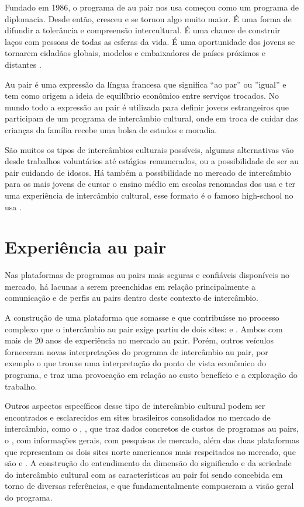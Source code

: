 
    Fundado em 1986, o programa de au pair nos \ac{usa} começou como um programa de diplomacia. Desde então, cresceu e se tornou algo muito maior. É uma forma de difundir a tolerância e compreensão intercultural. É uma chance de construir laços com pessoas de todas as esferas da vida. É uma oportunidade dos jovens se tornarem cidadãos globais, modelos e embaixadores de países próximos e distantes \cite{culturalCare2022}.
    
    Au pair é uma expressão da língua francesa que significa ``ao par'' ou ''igual'' e tem como origem a ideia de equilíbrio econômico entre serviços trocados. No mundo todo a expressão au pair é utilizada para definir jovens estrangeiros que participam de um programa de intercâmbio cultural, onde em troca de cuidar das crianças da família recebe uma bolsa de estudos e moradia.
    
    São muitos os tipos de intercâmbios culturais possíveis, algumas alternativas vão desde trabalhos voluntários até estágios remunerados, ou a possibilidade de ser au pair cuidando de idosos. Há também a possibilidade  no mercado de intercâmbio para os mais jovens de cursar o ensino médio em escolas renomadas dos \ac{usa} e ter uma experiência de intercâmbio cultural, esse formato é o famoso \gls{high-school} no \ac{usa} \cite{stbAuPair2022}.

    \section{Experiência au pair}

    Nas plataformas de programas au pairs mais seguras e confiáveis disponíveis no mercado, há lacunas a serem preenchidas em relação principalmente a comunicação e de perfis au pairs dentro deste contexto de intercâmbio.
    
    A construção de uma plataforma que somasse e que contribuísse no processo complexo que o intercâmbio au pair exige partiu de dois sites: \cite{auPair.com2022} e \cite{auPairInAmerica2022}.
    Ambos com mais de 20 anos de experiência no mercado au pair. Porém, outros veículos forneceram novas interpretações do programa de intercâmbio au pair, por exemplo o \cite{bbcNewsBrasil2017} que trouxe uma interpretação do ponto de vista econômico do programa, e traz uma provocação em relação ao custo benefício e a exploração do trabalho. 
    
    Outros aspectos específicos desse tipo de intercâmbio cultural podem ser encontrados e esclarecidos em sites brasileiros consolidados no mercado de intercâmbio, como o \cite{partiuIntercam2022}, \cite{interViagem2022}, que traz dados concretos de custos de programas au pairs, o \cite{culturalCare2022}, com informações gerais, \cite{eurekaFacts2020} com pesquisas de mercado, além das duas plataformas que representam os dois sites norte americanos mais respeitados no mercado, que são \cite{experimCultl2022} e \cite{centralInter2022}. A construção do entendimento da dimensão do significado e da seriedade do intercâmbio cultural com as características au pair foi sendo concebida em torno de diversas referências, e que fundamentalmente compuseram a visão geral do programa.
    
